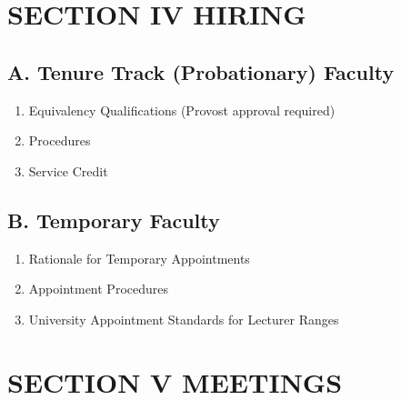 \documentclass{scrartcl}
\begin{document}
\section*{SECTION IV HIRING}
{}


\subsection*{A. Tenure Track (Probationary) Faculty}
{}


\begin{enumerate}
\item Equivalency Qualifications (Provost approval required)
\item Procedures
\item Service Credit
\end{enumerate}

\subsection*{B. Temporary Faculty}
{}


\begin{enumerate}
\item Rationale for Temporary Appointments
\item Appointment Procedures
\item University Appointment Standards for Lecturer Ranges
\end{enumerate}

\section*{SECTION V MEETINGS}
{}
\end{document}
